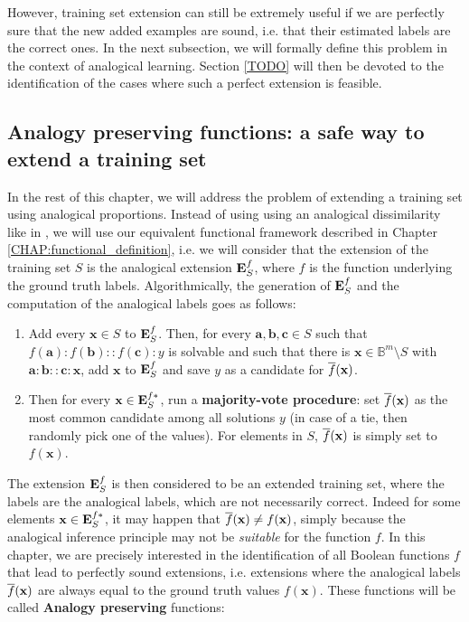 However, training set extension can still be extremely useful if we are
perfectly sure that the new added examples are sound, i.e. that their estimated
labels are the correct ones. In the next subsection, we will formally define
this problem in the context of analogical learning. Section \ref{TODO} will
then be devoted to the identification of the cases where such a perfect
extension is feasible.

\subsection {Analogy preserving functions: a safe way to extend a training set}
\label{SEC:analogy_preserving_presentation}

In the rest of this chapter, we will address the problem of extending a
training set using analogical proportions. Instead of using using an analogical
dissimilarity like in  \cite{BayMouMicAnqECML07}, we will use our equivalent
functional framework described in Chapter \ref{CHAP:functional_definition},
i.e. we will consider that the extension of the training set $S$ is the
analogical extension $\mathbf{E}_{S}^{f}$, where $f$ is the function underlying the ground
truth labels. Algorithmically, the generation of $\mathbf{E}_{S}^{f}$ and the computation of
the analogical labels goes as follows:
\begin{enumerate}
  \item Add every $\mathbf{x} \in S$ to $\mathbf{E}_{S}^{f}$. Then, for every
    $\mathbf{a},\mathbf{b},\mathbf{c} \in S$ such that $f(\mathbf{a}) :
    f(\mathbf{b}) :: f(\mathbf{c}) : y$ is solvable and such that there is
    $\mathbf{x} \in \mathbb{B}^m \setminus S$ with $\mathbf{a} : \mathbf{b} ::
    \mathbf{c} : \mathbf{x}$, add $\mathbf{x}$ to $\mathbf{E}_{S}^{f}$ and save
    $y$ as a candidate for $\overline{f}(\mathbf{x})$.
\item Then for every $\mathbf{x} \in \mathbf{E}_{S}^{f*}$, run a
  \textbf{majority-vote procedure}: set $\overline{f}(\mathbf{x})$ as the most
    common candidate among all solutions $y$ (in case of a tie, then randomly
    pick one of the values). For elements in $S$, $\overline{f}(\mathbf{x})$ is
    simply set to $f(\mathbf{x})$.
\end{enumerate}

\noindent
The extension $\mathbf{E}_{S}^{f}$ is then considered to be an extended training set, where
the labels are the analogical labels, which are not necessarily correct. Indeed
for some elements $\mathbf{x} \in \mathbf{E}_{S}^{f*}$, it may happen that
$\overline{f}(\mathbf{x}) \neq f(\mathbf{x})$, simply because the analogical inference
principle may not be \textit{suitable} for the function $f$. In this chapter,
we  are precisely interested in the identification of all Boolean functions $f$
that lead to perfectly sound extensions, i.e. extensions where the analogical
labels $\overline{f}(\mathbf{x})$ are always equal to the ground truth values
$f(\mathbf{x})$. These functions will be called \textbf{Analogy preserving}
functions:

